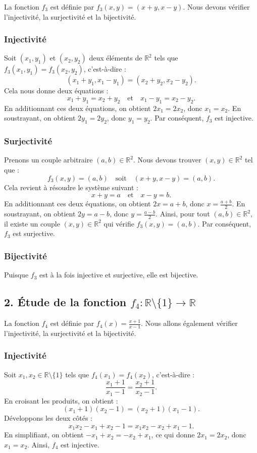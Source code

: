 \documentclass[a4paper,oneside,12pt]{amsbook}
\theoremstyle{definition}
\theoremstyle{remark}
\begin{document}
La fonction $f_3$ est définie par $f_3(x, y) = (x+y, x-y)$. Nous devons vérifier l'injectivité, la surjectivité et la bijectivité.

\subsubsection*{Injectivité}
Soit $(x_1, y_1)$ et $(x_2, y_2)$ deux éléments de $\mathbb{R}^2$ tels que $f_3(x_1, y_1) = f_3(x_2, y_2)$, c'est-à-dire :
\[
(x_1 + y_1, x_1 - y_1) = (x_2 + y_2, x_2 - y_2).
\]
Cela nous donne deux équations :
\[
x_1 + y_1 = x_2 + y_2 \quad \text{et} \quad x_1 - y_1 = x_2 - y_2.
\]
En additionnant ces deux équations, on obtient $2x_1 = 2x_2$, donc $x_1 = x_2$. En soustrayant, on obtient $2y_1 = 2y_2$, donc $y_1 = y_2$. Par conséquent, $f_3$ est injective.

\subsubsection*{Surjectivité}
Prenons un couple arbitraire $(a, b) \in \mathbb{R}^2$. Nous devons trouver $(x, y) \in \mathbb{R}^2$ tel que :
\[
f_3(x, y) = (a, b) \quad \text{soit} \quad (x+y, x-y) = (a, b).
\]
Cela revient à résoudre le système suivant :
\[
x + y = a \quad \text{et} \quad x - y = b.
\]
En additionnant ces deux équations, on obtient $2x = a + b$, donc $x = \frac{a+b}{2}$. En soustrayant, on obtient $2y = a - b$, donc $y = \frac{a-b}{2}$. Ainsi, pour tout $(a, b) \in \mathbb{R}^2$, il existe un couple $(x, y) \in \mathbb{R}^2$ qui vérifie $f_3(x, y) = (a, b)$. Par conséquent, $f_3$ est surjective.

\subsubsection*{Bijectivité}
Puisque $f_3$ est à la fois injective et surjective, elle est bijective.

\subsection*{2. Étude de la fonction $f_4 : \mathbb{R} \setminus \{1\} \to \mathbb{R}$}

La fonction $f_4$ est définie par $f_4(x) = \frac{x+1}{x-1}$. Nous allons également vérifier l'injectivité, la surjectivité et la bijectivité.

\subsubsection*{Injectivité}
Soit $x_1, x_2 \in \mathbb{R} \setminus \{1\}$ tels que $f_4(x_1) = f_4(x_2)$, c'est-à-dire :
\[
\frac{x_1+1}{x_1-1} = \frac{x_2+1}{x_2-1}.
\]
En croisant les produits, on obtient :
\[
(x_1+1)(x_2-1) = (x_2+1)(x_1-1).
\]
Développons les deux côtés :
\[
x_1x_2 - x_1 + x_2 - 1 = x_1x_2 - x_2 + x_1 - 1.
\]
En simplifiant, on obtient $-x_1 + x_2 = -x_2 + x_1$, ce qui donne $2x_1 = 2x_2$, donc $x_1 = x_2$. Ainsi, $f_4$ est injective.
\end{document}
